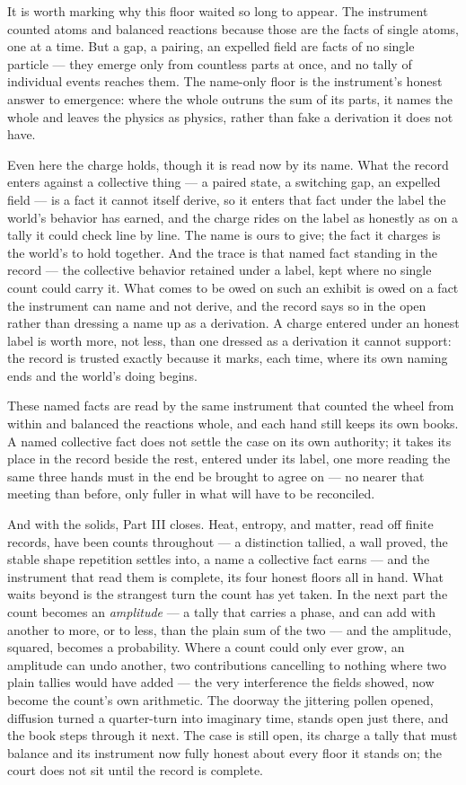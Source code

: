 It is worth marking why this floor waited so long to appear. The instrument counted atoms and balanced
reactions because those are the facts of single atoms, one at a time. But a gap, a pairing, an expelled field
are facts of no single particle --- they emerge only from countless parts at once, and no tally of individual
events reaches them. The name-only floor is the instrument's honest answer to emergence: where the whole
outruns the sum of its parts, it names the whole and leaves the physics as physics, rather than fake a
derivation it does not have.

Even here the charge holds, though it is read now by its name. What the record enters against a collective
thing --- a paired state, a switching gap, an expelled field --- is a fact it cannot itself derive, so it enters
that fact under the label the world's behavior has earned, and the charge rides on the label as honestly as on a
tally it could check line by line. The name is ours to give; the fact it charges is the world's to hold
together. And the trace is that named fact standing in the record --- the collective behavior retained under a
label, kept where no single count could carry it. What comes to be owed on such an exhibit is owed on a fact the
instrument can name and not derive, and the record says so in the open rather than dressing a name up as a
derivation. A charge entered under an honest label is worth more, not less, than one dressed as a derivation it
cannot support: the record is trusted exactly because it marks, each time, where its own naming ends and the
world's doing begins.

These named facts are read by the same instrument that counted the wheel from within and balanced the reactions
whole, and each hand still keeps its own books. A named collective fact does not settle the case on its own
authority; it takes its place in the record beside the rest, entered under its label, one more reading the same
three hands must in the end be brought to agree on --- no nearer that meeting than before, only fuller in what
will have to be reconciled.

And with the solids, Part III closes. Heat, entropy, and matter, read off finite records, have been counts
throughout --- a distinction tallied, a wall proved, the stable shape repetition settles into, a name a
collective fact earns --- and the instrument that read them is complete, its four honest floors all in hand.
What waits beyond is the strangest turn the count has yet taken. In the next part the count becomes an
\emph{amplitude} --- a tally that carries a phase, and can add with another to more, or to less, than the plain
sum of the two --- and the amplitude, squared, becomes a probability. Where a count could only ever grow, an
amplitude can undo another, two contributions cancelling to nothing where two plain tallies would have added ---
the very interference the fields showed, now become the count's own arithmetic. The doorway the jittering pollen
opened, diffusion turned a quarter-turn into imaginary time, stands open just there, and the book steps through
it next.
The case is still open, its charge a tally that must balance and its instrument now fully honest about every
floor it stands on; the court does not sit until the record is complete.
